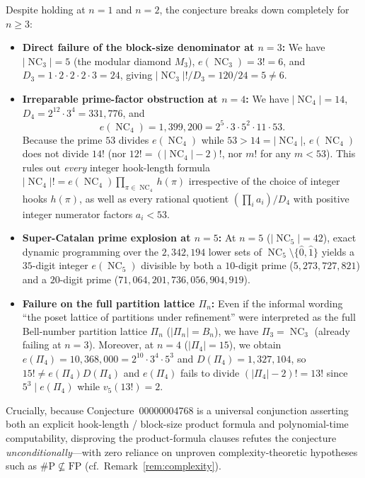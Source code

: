 \documentclass[11pt]{article}
\theoremstyle{definition}
\newcommand{\NC}{\operatorname{NC}}
\begin{document}
Despite holding at $n = 1$ and $n = 2$, the conjecture breaks down completely for $n \ge 3$:
\begin{itemize}
  \item \textbf{Direct failure of the block-size denominator at $n = 3$:}
  We have $|\NC_3| = 5$ (the modular diamond $M_3$), $e(\NC_3) = 3! = 6$, and
  $D_3 = 1 \cdot 2 \cdot 2 \cdot 2 \cdot 3 = 24$, giving $|\NC_3|! / D_3 = 120 / 24 = 5 \ne 6$.
  \item \textbf{Irreparable prime-factor obstruction at $n = 4$:}
  We have $|\NC_4| = 14$, $D_4 = 2^{12} \cdot 3^4 = 331{,}776$, and
  \[
    e(\NC_4) = 1{,}399{,}200 = 2^5 \cdot 3 \cdot 5^2 \cdot 11 \cdot 53.
  \]
  Because the prime $53$ divides $e(\NC_4)$ while $53 > 14 = |\NC_4|$, $e(\NC_4)$ does
  not divide $14!$ (nor $12! = (|\NC_4|-2)!$, nor $m!$ for any $m < 53$). This rules out
  \emph{every} integer hook-length formula $|\NC_4|! = e(\NC_4) \prod_{\pi \in \NC_4} h(\pi)$
  irrespective of the choice of integer hooks $h(\pi)$, as well as every rational quotient
  $(\prod_i a_i) / D_4$ with positive integer numerator factors $a_i < 53$.
  \item \textbf{Super-Catalan prime explosion at $n = 5$:}
  At $n = 5$ ($|\NC_5| = 42$), exact dynamic programming over the $2{,}342{,}194$ lower
  sets of $\NC_5 \setminus \{\hat{0}, \hat{1}\}$ yields a $35$-digit integer
  $e(\NC_5)$ divisible by both a $10$-digit prime ($5{,}273{,}727{,}821$) and a $20$-digit
  prime ($71{,}064{,}201{,}736{,}056{,}904{,}919$).
  \item \textbf{Failure on the full partition lattice $\Pi_n$:}
  Even if the informal wording ``the poset lattice of partitions under refinement'' were
  interpreted as the full Bell-number partition lattice $\Pi_n$ ($|\Pi_n| = B_n$), we have
  $\Pi_3 = \NC_3$ (already failing at $n = 3$). Moreover, at $n = 4$ ($|\Pi_4| = 15$),
  we obtain $e(\Pi_4) = 10{,}368{,}000 = 2^{10} \cdot 3^4 \cdot 5^3$ and
  $D(\Pi_4) = 1{,}327{,}104$, so $15! \ne e(\Pi_4) D(\Pi_4)$ and $e(\Pi_4)$ fails to divide
  $(|\Pi_4|-2)! = 13!$ since $5^3 \mid e(\Pi_4)$ while $v_5(13!) = 2$.
\end{itemize}

Crucially, because Conjecture~00000004768 is a universal conjunction asserting both an
explicit hook-length / block-size product formula and polynomial-time computability,
disproving the product-formula clauses refutes the conjecture \emph{unconditionally}---with
zero reliance on unproven complexity-theoretic hypotheses such as $\mathrm{\#P} \not\subseteq
\mathrm{FP}$ (cf.\ Remark~\ref{rem:complexity}).
\end{document}
